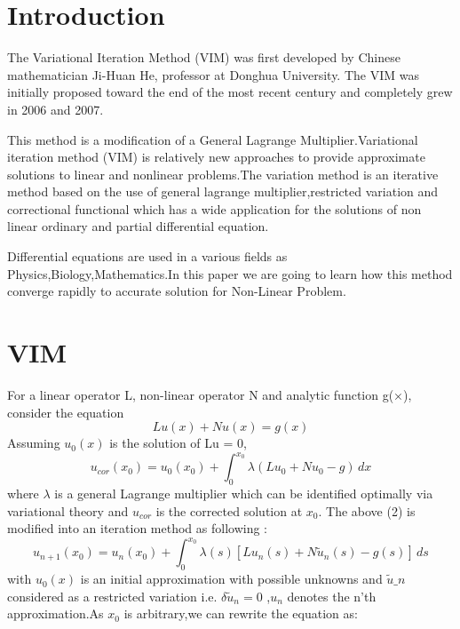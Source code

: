 \documentclass[12pt, a4paper]{report}
\begin{document}


   \section{Introduction} 
     \vspace{4.5pt}
     The Variational Iteration Method (VIM) was first developed by Chinese mathematician Ji-Huan He, professor at Donghua University. The VIM was initially proposed toward the end of the most recent century and completely grew in 2006 and 2007. 
    
    \vspace{4.5pt}
     
     This method is a modification of a General Lagrange Multiplier.Variational iteration method (VIM) is relatively new approaches to provide approximate solutions to linear and nonlinear problems.The variation method is an iterative method based on the use of general lagrange multiplier,restricted variation and correctional functional which has a wide application for the solutions of non linear ordinary and partial differential equation.
         \vspace{4.5pt}
         
     Differential equations are used in a various fields as Physics,Biology,Mathematics.In this paper we are going to learn how this method converge rapidly to accurate solution for Non-Linear Problem.

\section{VIM}
For a linear operator L, non-linear operator N and analytic function g(×), consider the equation
\begin{equation}
    Lu(x)+Nu(x) = g(x)
\end{equation}
Assuming $u_{0}(x)$ is the solution of Lu = 0,
     \begin{equation}
      u_{cor}(x_0) = u_0(x_0) + \int_{0}^{x_0} \lambda (Lu_0+Nu_0-g)\,dx
     \end{equation}
where $\lambda$ is a general Lagrange multiplier which can be identified optimally via variational theory and $u_{cor}$ is the corrected solution at $x_0$. The above (2) is modified into an iteration method as following :
     \begin{equation}
            u_{n+1}(x_0) = u_n(x_0) + \int_{0}^{x_0} \lambda(s) [Lu_n(s)+N\tilde{u}_n(s)-g(s)]\,ds
     \end{equation}
with $u_0(x)$ is an initial approximation with possible unknowns and $\tilde{u}\_n$ considered as a restricted variation i.e. $\delta \tilde{u}_n=0 $ ,$u_n$ denotes the n'th approximation.As $x_0$ is arbitrary,we can rewrite the equation as:
\end{document}

